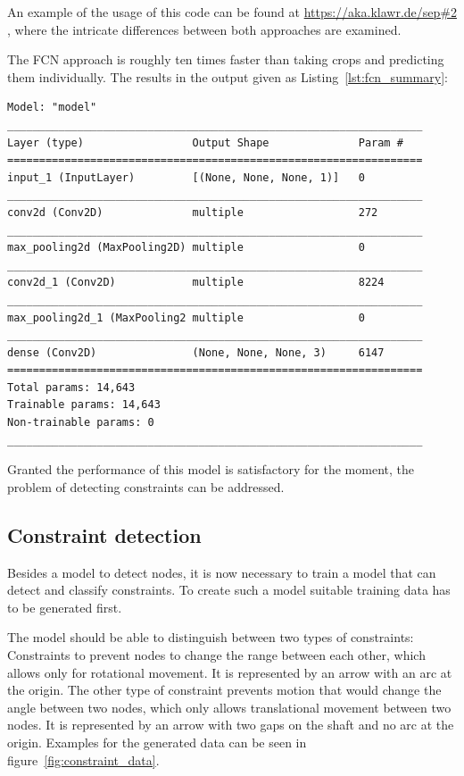 An example of the usage of this code can be found at \url{https://aka.klawr.de/sep#2} %
, where the intricate differences between both approaches are examined.

The FCN approach is roughly ten times faster than taking crops and predicting them individually. 
The  results in the output given as Listing~\ref{lst:fcn_summary}:

\begin{lstlisting}[label={lst:fcn_summary}, caption={Summary of Symbol Classifier transformed into a FCN.}]
Model: "model"
_________________________________________________________________
Layer (type)                 Output Shape              Param #   
=================================================================
input_1 (InputLayer)         [(None, None, None, 1)]   0         
_________________________________________________________________
conv2d (Conv2D)              multiple                  272       
_________________________________________________________________
max_pooling2d (MaxPooling2D) multiple                  0         
_________________________________________________________________
conv2d_1 (Conv2D)            multiple                  8224      
_________________________________________________________________
max_pooling2d_1 (MaxPooling2 multiple                  0         
_________________________________________________________________
dense (Conv2D)               (None, None, None, 3)     6147      
=================================================================
Total params: 14,643
Trainable params: 14,643
Non-trainable params: 0
_________________________________________________________________
\end{lstlisting}

Granted the performance of this model is satisfactory for the moment, the problem of detecting constraints can be addressed.

\subsection{Constraint detection}

Besides a model to detect nodes, it is now necessary to train a model that can detect and classify constraints.
To create such a model suitable training data has to be generated first.

The model should be able to distinguish between two types of constraints:
Constraints to prevent nodes to change the range between each other, which allows only for rotational movement.
It is represented by an arrow with an arc at the origin.
The other type of constraint prevents motion that would change the angle between two nodes, which only allows translational movement between two nodes.
It is represented by an arrow with two gaps on the shaft and no arc at the origin.
Examples for the generated data can be seen in figure~\ref{fig:constraint_data}.

